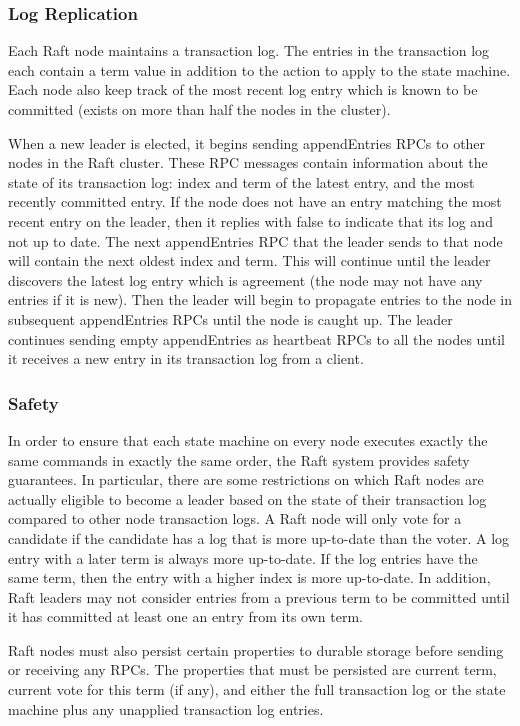 \documentclass{acmtog} %
\begin{document}
\subsubsection{Log Replication}

Each Raft node maintains a transaction log. The entries in the
transaction log each contain a term value in addition to the action to
apply to the state machine. Each node also keep track of the most
recent log entry which is known to be committed (exists on more than
half the nodes in the cluster).

When a new leader is elected, it begins sending appendEntries RPCs
to other nodes in the Raft cluster. These RPC messages contain
information about the state of its transaction log: index and term of
the latest entry, and the most recently committed entry. If the node
does not have an entry matching the most recent entry on the leader,
then it replies with false to indicate that its log and not up to
date. The next appendEntries RPC that the leader sends to that
node will contain the next oldest index and term. This will continue
until the leader discovers the latest log entry which is agreement
(the node may not have any entries if it is new). Then the leader will
begin to propagate entries to the node in subsequent appendEntries
RPCs until the node is caught up. The leader continues sending
empty appendEntries as heartbeat RPCs to all the nodes until it
receives a new entry in its transaction log from a client.

\subsubsection{Safety}

In order to ensure that each state machine on every node executes
exactly the same commands in exactly the same order, the Raft system
provides safety guarantees. In particular, there are some restrictions
on which Raft nodes are actually eligible to become a leader based on
the state of their transaction log compared to other node transaction
logs. A Raft node will only vote for a candidate if the candidate has
a log that is more up-to-date than the voter. A log entry with a later
term is always more up-to-date. If the log entries have the same term,
then the entry with a higher index is more up-to-date. In addition,
Raft leaders may not consider entries from a previous term to be
committed until it has committed at least one an entry from its own
term.

Raft nodes must also persist certain properties to durable storage
before sending or receiving any RPCs. The properties that must be
persisted are current term, current vote for this term (if any), and
either the full transaction log or the state machine plus any
unapplied transaction log entries.
\end{document}
